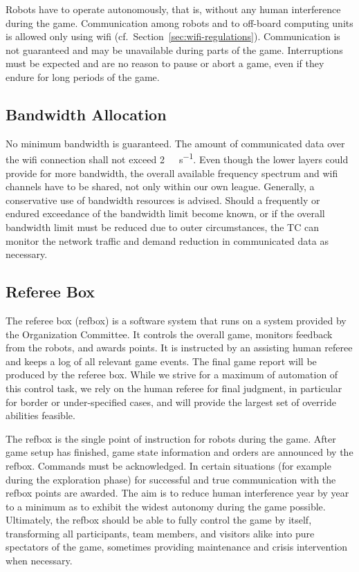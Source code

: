 \documentclass[12pt,twoside]{article}
\newcommand{\refsec}[1]{Section~\ref{#1}}
\begin{document}
Robots have to operate autonomously, that is, without any human
interference during the game. Communication among robots and to
off-board computing units is allowed only using wifi
(cf.~\refsec{sec:wifi-regulations}). Communication is not guaranteed
and may be unavailable during parts of the game. Interruptions must be
expected and are no reason to pause or abort a game, even if they
endure for long periods of the game.

\subsection{Bandwidth Allocation}
\label{sec:bandwidth}
No minimum bandwidth is guaranteed. The amount of communicated data
over the wifi connection shall not exceed
\SI[per-mode=symbol]{2}{\mega\bit\per\second}. Even though the lower
layers could provide for more bandwidth, the overall available
frequency spectrum and wifi channels have to be shared, not only
within our own league. Generally, a conservative use of bandwidth
resources is advised. Should a frequently or endured exceedance of the
bandwidth limit become known, or if the overall bandwidth limit must
be reduced due to outer circumstances, the TC can monitor the network
traffic and demand reduction in communicated data as necessary.

\subsection{Referee Box}
\label{sec:referee-box}
The referee box (refbox) is a software system that runs on a system
provided by the Organization Committee. It controls the overall game,
monitors feedback from the robots, and awards points. It is instructed
by an assisting human referee and keeps a log of all relevant game
events. The final game report will be produced by the referee
box. While we strive for a maximum of automation of this control task,
we rely on the human referee for final judgment, in particular for
border or under-specified cases, and will provide the largest set of
override abilities feasible.

The refbox is the single point of instruction for robots during the
game. After game setup has finished, game state information and orders
are announced by the refbox. Commands must be acknowledged. In certain
situations (for example during the exploration phase) for successful
and true communication with the refbox points are awarded. The aim is
to reduce human interference year by year to a minimum as to exhibit
the widest autonomy during the game possible. Ultimately, the refbox
should be able to fully control the game by itself, transforming all
participants, team members, and visitors alike into pure spectators of
the game, sometimes providing maintenance and crisis intervention when
necessary.
\end{document}
